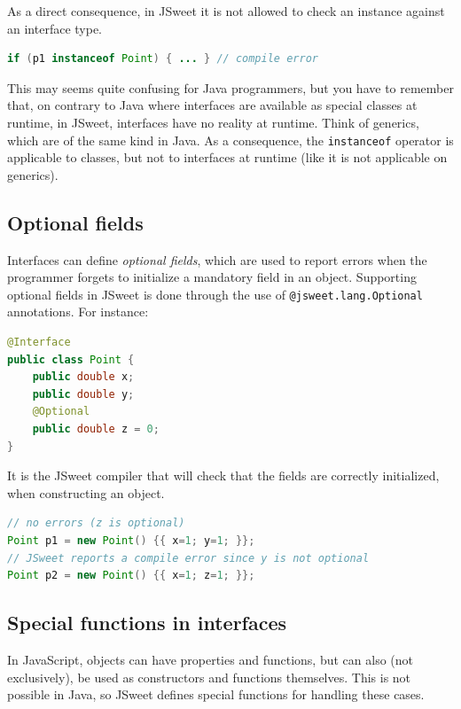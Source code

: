 \documentclass[a4paper]{report}
\begin{document}
\noindent
As a direct consequence, in JSweet it is not allowed to check an instance against an interface type.

\begin{lstlisting}[language=Java]
if (p1 instanceof Point) { ... } // compile error
\end{lstlisting}

\noindent
This may seems quite confusing for Java programmers, but you have to remember that, on contrary to Java where interfaces are available as special classes at runtime, in JSweet, interfaces have no reality at runtime. Think of generics, which are of the same kind in Java. As a consequence, the \texttt{instanceof} operator is applicable to classes, but not to interfaces at runtime (like it is not applicable on generics).

\subsection{Optional fields}
 
Interfaces can define \emph{optional fields}, which are used to report errors when the programmer forgets to initialize a mandatory field in an object. Supporting optional fields in JSweet is done through the use of \texttt{@jsweet.lang.Optional} annotations. For instance:

\begin{lstlisting}[language=Java]
@Interface
public class Point {
	public double x;
	public double y;
	@Optional
	public double z = 0;
}
\end{lstlisting}

It is the JSweet compiler that will check that the fields are correctly initialized, when constructing an object.

\begin{lstlisting}[language=Java]
// no errors (z is optional)
Point p1 = new Point() {{ x=1; y=1; }};
// JSweet reports a compile error since y is not optional
Point p2 = new Point() {{ x=1; z=1; }};
\end{lstlisting}

\subsection{Special functions in interfaces}

In JavaScript, objects can have properties and functions, but can also (not exclusively), be used as constructors and functions themselves. This is not possible in Java, so JSweet defines special functions for handling these cases.
\end{document}
